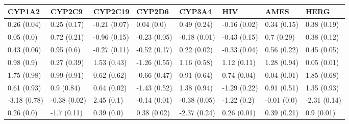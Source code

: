 \begin{tabular}{llllllll}
\toprule
CYP1A2 & CYP2C9 & CYP2C19 & CYP2D6 & CYP3A4 & HIV & AMES & HERG \\
\midrule
0.26 (0.04) & 0.25 (0.17) & -0.21 (0.07) & 0.04 (0.0) & 0.49 (0.24) & -0.16 (0.02) & 0.34 (0.15) & 0.38 (0.19) \\
0.05 (0.0) & 0.72 (0.21) & -0.96 (0.15) & -0.23 (0.05) & -0.18 (0.01) & -0.43 (0.15) & 0.7 (0.29) & 0.38 (0.12) \\
0.43 (0.06) & 0.95 (0.6) & -0.27 (0.11) & -0.52 (0.17) & 0.22 (0.02) & -0.33 (0.04) & 0.56 (0.22) & 0.45 (0.05) \\
0.98 (0.9) & 0.27 (0.39) & 1.53 (0.43) & -1.26 (0.55) & 1.16 (0.58) & 1.12 (0.11) & 1.28 (0.94) & 0.05 (0.01) \\
1.75 (0.98) & 0.99 (0.91) & 0.62 (0.62) & -0.66 (0.47) & 0.91 (0.64) & 0.74 (0.04) & 0.04 (0.01) & 1.85 (0.68) \\
0.61 (0.93) & 0.9 (0.84) & 0.64 (0.02) & -1.43 (0.52) & 1.38 (0.94) & -1.29 (0.22) & 0.91 (0.51) & 1.35 (0.93) \\
-3.18 (0.78) & -0.38 (0.02) & 2.45 (0.1) & -0.14 (0.01) & -0.38 (0.05) & -1.22 (0.2) & -0.01 (0.0) & -2.31 (0.14) \\
0.26 (0.0) & -1.7 (0.11) & 0.39 (0.0) & 0.38 (0.02) & -2.37 (0.24) & 0.26 (0.01) & 0.39 (0.21) & 0.9 (0.01) \\
\bottomrule
\end{tabular}
